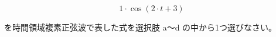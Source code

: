 \[
1 \cdot \cos \left ( 2 \cdot t + 3 \right )
\]

\bigskip
\noindent を時間領域複素正弦波で表した式を選択肢 a〜d の中から1つ選びなさい。
